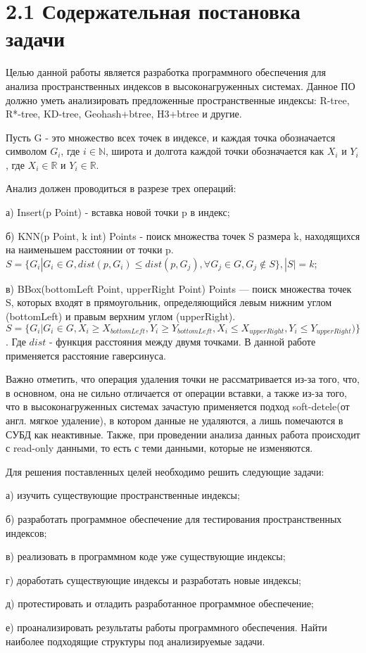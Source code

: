 \vspace{-2em}
\section{2.1 Содержательная постановка задачи}

Целью данной работы является разработка программного обеспечения для анализа пространственных индексов в высоконагруженных системах. Данное ПО должно уметь анализировать предложенные пространственные индексы: R-tree, R*-tree, KD-tree, Geohash+btree, H3+btree и другие.

Пусть G - это множество всех точек в индексе, и каждая точка обозначается символом $G_i$, где $i \in \mathbb{N}$, широта и долгота каждой точки обозначается как $X_i$ и $Y_i$, где $X_i \in \mathbb{R}$ и $Y_i \in \mathbb{R}$.

Анализ должен проводиться в разрезе трех операций:
\par а) Insert(p Point) - вставка новой точки p в индекс;
\par б) KNN(p Point, k int) Points -  поиск множества точек S размера k, находящихся на наименьшем расстоянии от точки p. $S=\{G_i | G_i \in G, dist(p, G_i) \leq dist(p, G_j),  \forall G_j \in G, G_j \notin S \}, |S| = k$;
\par в) BBox(bottomLeft Point, upperRight Point) Points --- поиск множества точек S, которых входят в прямоугольник, определяющийся левым нижним углом (bottomLeft) и правым верхним углом (upperRight). $S=\{G_i | G_i \in G, X_i \geq X_{bottomLeft}, Y_i \geq Y_{bottomLeft}, X_i \leq X_{upperRight}, Y_i \leq Y_{upperRight} )\}$.
Где $dist$ - функция расстояния между двумя точками. В данной работе применяется расстояние гаверсинуса. 

Важно отметить, что операция удаления точки не рассматривается из-за того, что, в основном, она не сильно отличается от операции вставки\cite{bayerIndices}, а также из-за того, что в высоконагруженных системах зачастую применяется подход soft-detele(от англ. мягкое удаление), в котором данные не удаляются, а лишь помечаются в СУБД как неактивные. Также, при проведении анализа данных работа происходит с read-only данными, то есть с теми данными, которые не изменяются. 

Для решения поставленных целей необходимо решить следующие задачи:
\par а) изучить существующие пространственные индексы;
\par б) разработать программное обеспечение для тестирования пространственных индексов;
\par в) реализовать в программном коде уже существующие индексы;
\par г) доработать существующие индексы и разработать новые индексы;
\par д) протестировать и отладить разработанное программное обеспечение;
\par е) проанализировать результаты работы программного обеспечения. Найти наиболее подходящие структуры под анализируемые задачи.
